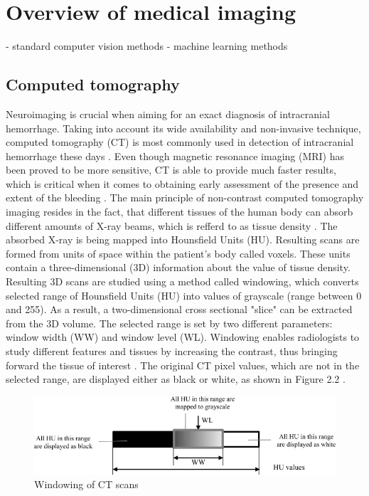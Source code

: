 \chapter{Overview of medical imaging}
- standard computer vision methods
- machine learning methods
\section{Computed tomography}
Neuroimaging is crucial when aiming for an exact diagnosis of intracranial hemorrhage.  Taking into account its wide availability and non-invasive technique, computed tomography (CT) is most commonly used in detection of intracranial hemorrhage these days \cite{imagingICH}. Even though magnetic resonance imaging (MRI) has been proved to be more sensitive, CT is able to provide much faster results, which is critical when it comes to obtaining early assessment of the presence and extent of the bleeding \cite{imagingAfterBrainInjury}. The main principle of non-contrast computed tomography imaging resides in the fact, that different tissues of the human body can absorb different amounts of X-ray beams, which is refferd to as tissue density \cite{principlesOfCT}. The absorbed X-ray is being mapped into Hounsfield Units (HU). Resulting scans are formed from units of space within the patient's body called voxels. These units contain a three-dimensional (3D) information about the value of tissue density. Resulting 3D scans are studied using a method called windowing, which converts selected range of Hounsfield Units (HU) into values of grayscale (range between 0 and 255).  As a result, a two-dimensional cross sectional "slice" can be extracted from the 3D volume. The selected range is set by two different parameters: window width (WW) and window level (WL). Windowing enables radiologists to study different features and tissues by increasing the contrast, thus bringing forward the tissue of interest \cite{windowClassBiomArt}. The original CT pixel values, which are not in the selected range, are displayed either as black or white, as shown in Figure 2.2 .

\begin{figure}[h]
\begin{centering}
\includegraphics[width=15cm]{assets/images/windowingHU}
\par\end{centering}
\caption{Windowing of CT scans \cite{windowClassBiomArt}
\label{fig:windowing}}
\end{figure}

